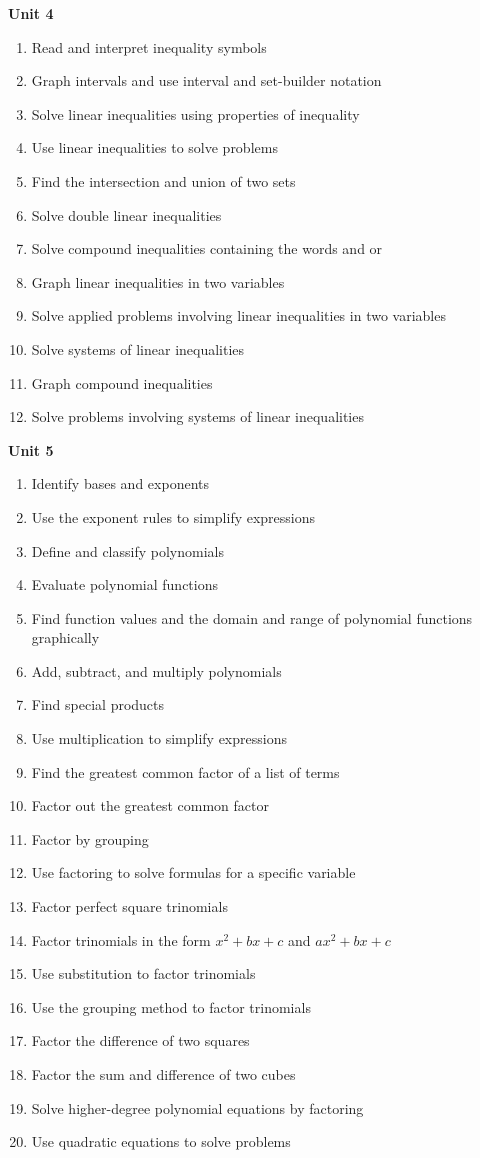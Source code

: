 \documentclass[11pt]{article}
\newenvironment{alphalist}{
\begin{enumerate}[label=(\arabic*),widest=107 ,leftmargin=25pt, itemsep=0pt]}
{\end{enumerate}}
\begin{document}
\noindent \textbf{Unit 4}
\begin{alphalist}
    \item Read and interpret inequality symbols
    \item Graph intervals and use interval and set-builder notation
    \item Solve linear inequalities using properties of inequality
    \item Use linear inequalities to solve problems
    \item Find the intersection and union of two sets
    \item Solve double linear inequalities
    \item Solve compound inequalities containing the words and or
    \item Graph linear inequalities in two variables
    \item Solve applied problems involving linear inequalities in two variables
    \item Solve systems of linear inequalities
    \item Graph compound inequalities
    \item Solve problems involving systems of linear inequalities
\end{alphalist}
\noindent \textbf{Unit 5}
\begin{alphalist}
    \item Identify bases and exponents
    \item Use the exponent rules to simplify expressions
    \item Define and classify polynomials
    \item Evaluate polynomial functions
    \item Find function values and the domain and range of polynomial functions graphically
    \item Add, subtract, and multiply polynomials
    \item Find special products
    \item Use multiplication to simplify expressions
    \item Find the greatest common factor of a list of terms
    \item Factor out the greatest common factor
    \item Factor by grouping
    \item Use factoring to solve formulas for a specific variable
    \item Factor perfect square trinomials
    \item Factor trinomials in the form $x^2 + bx + c$ and $ax^2 + bx + c$
    \item Use substitution to factor trinomials
    \item Use the grouping method to factor trinomials
    \item Factor the difference of two squares
    \item Factor the sum and difference of two cubes
    \item Solve higher-degree polynomial equations by factoring
    \item Use quadratic equations to solve problems
\end{alphalist}
 
\end{document}
